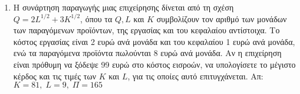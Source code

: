 \begin{enumerate}
  \item Η συνάρτηση παραγωγής μιας επιχείρησης δίνεται από τη σχέση 
    $ Q=2L^{1/2}+3K^{1/2} $, όπου τα $ Q, L $ και $K$ συμβολίζουν τον αριθμό των 
    μονάδων των παραγόμενων προϊόντων, της εργασίας και του κεφαλαίου αντίστοιχα. 
    Το κόστος εργασίας είναι 2 ευρώ ανά μονάδα και του κεφαλαίου 1 ευρώ ανά μονάδα, ενώ 
    τα παραγόμενα προϊόντα πωλούνται 8 ευρώ ανά μονάδα. Αν η επιχείρηση είναι πρόθυμη να 
    ξόδεψε 99 ευρώ στο κόστος εισροών, να υπολογίσετε το μέγιστο κέρδος και τις τιμές 
    των $K$ και $L$, για τις οποίες αυτό επιτυγχάνεται.
    \hfill Απ: $ K=81, \; L=9, \; \Pi = 165 $ 
\end{enumerate} 






